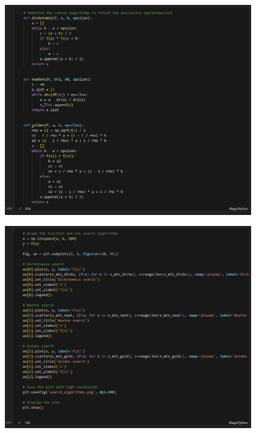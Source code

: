 {\begin{td-sol}
\begin{enumerate}
            \begin{center}
                \includegraphics[width=0.8\textwidth]{../assets/code_10_redefine.png}
            \end{center}
            
            \begin{center}
                \includegraphics[width=0.8\textwidth]{../assets/code_11_graph.png}
            \end{center}
            

\end{enumerate}
\end{td-sol}}
